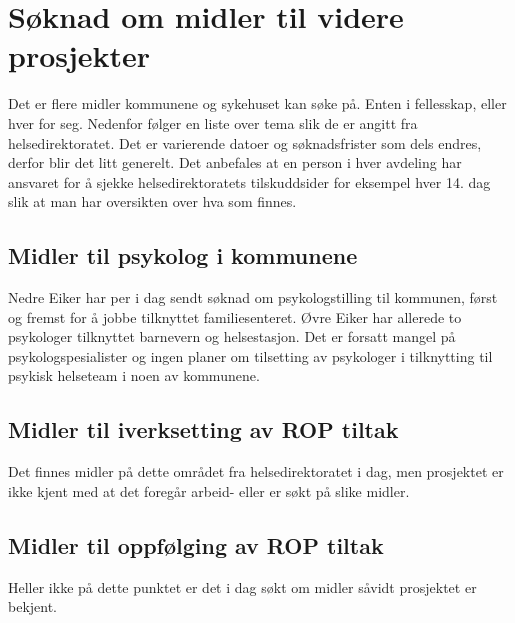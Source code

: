 \documentclass[11pt]{report} %
\begin{document}
                \section{Søknad om midler til videre prosjekter}\label{chap:vvidere_soknmid}
                  Det er flere midler kommunene og sykehuset kan søke på. Enten i fellesskap, eller hver for seg. Nedenfor følger en liste over tema slik de er angitt fra helsedirektoratet. Det er varierende datoer og søknadsfrister som dels endres, derfor blir det litt generelt. Det anbefales at en person i hver avdeling har ansvaret for å sjekke helsedirektoratets tilskuddsider for eksempel hver 14. dag slik at man har oversikten over hva som finnes.\\
                  \subsection{Midler til psykolog i kommunene}\label{sec:vv_mid_psyk}
                    Nedre Eiker har per i dag sendt søknad om psykologstilling til kommunen, først og fremst for å jobbe tilknyttet familiesenteret. Øvre Eiker har allerede to psykologer tilknyttet barnevern og helsestasjon. Det er forsatt mangel på psykologspesialister og ingen planer om tilsetting av psykologer i tilknytting til psykisk helseteam i noen av kommunene.
                  \subsection{Midler til iverksetting av ROP tiltak}\label{sec:vv_mid_iverksetting_ROP}
                    Det finnes midler på dette området fra helsedirektoratet i dag, men prosjektet er ikke kjent med at det foregår arbeid- eller er søkt på slike midler.
                  \subsection{Midler til oppfølging av ROP tiltak}\label{sec:vv_mid_oppf_ROP}
                    Heller ikke på dette punktet er det i dag søkt om midler såvidt prosjektet er bekjent. 


              
\end{document}
